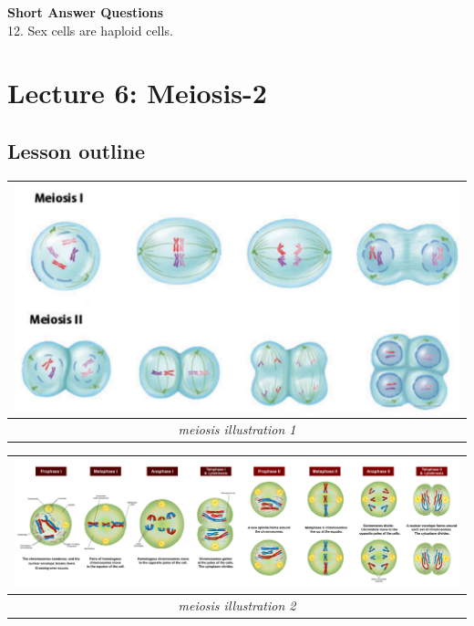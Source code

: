 \documentclass[
]{book}
\begin{document}
\textbf{Short Answer Questions}\\
12. Sex cells are haploid cells.

\hypertarget{lecture-6-meiosis-2}{%
\section{Lecture 6: Meiosis-2}\label{lecture-6-meiosis-2}}

\hypertarget{lesson-outline-2}{%
\subsection{Lesson outline}\label{lesson-outline-2}}

\begin{longtable}[]{@{}c@{}}
\toprule\noalign{}
\includegraphics{./img/meiosis2.png} \\
\midrule\noalign{}
\endhead
\bottomrule\noalign{}
\endlastfoot
\emph{meiosis illustration 1} \\
\end{longtable}

\begin{longtable}[]{@{}c@{}}
\toprule\noalign{}
\includegraphics{./img/Meiosis_Stages.svg.png} \\
\midrule\noalign{}
\endhead
\bottomrule\noalign{}
\endlastfoot
\emph{meiosis illustration 2} \\
\end{longtable}
\end{document}
